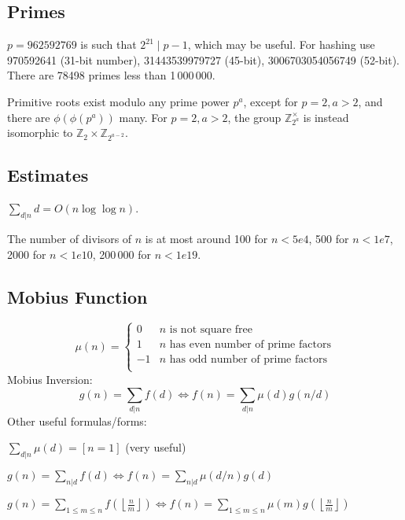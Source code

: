 \subsection{Primes}
  $p=962592769$ is such that $2^{21} \mid p-1$, which may be useful. For hashing
  use 970592641 (31-bit number), 31443539979727 (45-bit), 3006703054056749
  (52-bit). There are 78498 primes less than 1\,000\,000.

  Primitive roots exist modulo any prime power $p^a$, except for $p = 2, a > 2$, and there are $\phi(\phi(p^a))$ many.
  For $p = 2, a > 2$, the group $\mathbb Z_{2^a}^\times$ is instead isomorphic to $\mathbb Z_2 \times \mathbb Z_{2^{a-2}}$.

\subsection{Estimates}
  $\sum_{d|n} d = O(n \log \log n)$.

  The number of divisors of $n$ is at most around 100 for $n < 5e4$, 500 for $n < 1e7$, 2000 for $n < 1e10$, 200\,000 for $n < 1e19$.

\subsection{Mobius Function}
\[
  \mu(n) = \begin{cases} 0 & n \textrm{ is not square free}\\ 1 & n \textrm{ has even number of prime factors}\\ -1 & n \textrm{ has odd number of prime factors}\\\end{cases}
\]
  Mobius Inversion:
  \[ g(n) = \sum_{d|n} f(d) \Leftrightarrow f(n) = \sum_{d|n} \mu(d)g(n/d) \]
  Other useful formulas/forms:

  $ \sum_{d | n} \mu(d) = [ n = 1] $ (very useful)

  $ g(n) = \sum_{n|d} f(d) \Leftrightarrow f(n) = \sum_{n|d} \mu(d/n)g(d)$

 $ g(n) = \sum_{1 \leq m \leq n} f(\left\lfloor\frac{n}{m}\right \rfloor ) \Leftrightarrow f(n) = \sum_{1\leq m\leq n} \mu(m)g(\left\lfloor\frac{n}{m}\right\rfloor)$

